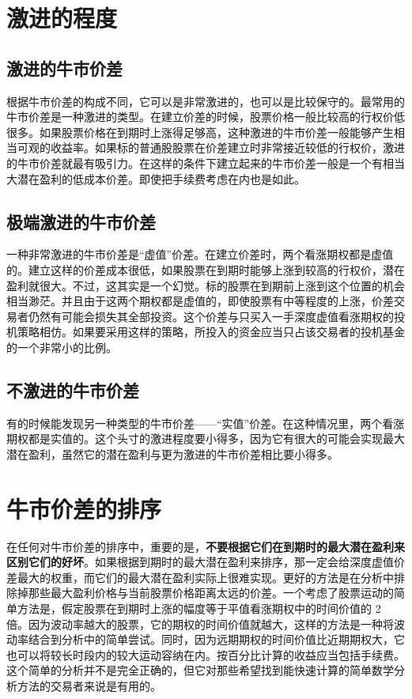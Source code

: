 \section{激进的程度}
\subsection{激进的牛市价差}
根据牛市价差的构成不同，它可以是非常激进的，也可以是比较保守的。最常用的牛市价差是一种激进的类型。在建立价差的时候，股票价格一般比较高的行权价低很多。如果股票价格在到期时上涨得足够高，这种激进的牛市价差一般能够产生相当可观的收益率。如果标的普通股股票在价差建立时非常接近较低的行权价，激进的牛市价差就最有吸引力。在这样的条件下建立起来的牛市价差一般是一个有相当大潜在盈利的低成本价差。即使把手续费考虑在内也是如此。
\subsection{极端激进的牛市价差}
一种非常激进的牛市价差是“虚值”价差。在建立价差时，两个看涨期权都是虚值的。建立这样的价差成本很低，如果股票在到期时能够上涨到较高的行权价，潜在盈利就很大。不过，这其实是一个幻觉。标的股票在到期前上涨到这个位置的机会相当渺茫。并且由于这两个期权都是虚值的，即使股票有中等程度的上涨，价差交易者仍然有可能会损失其全部投资。这个价差与只买入一手深度虚值看涨期权的投机策略相仿。如果要采用这样的策略，所投入的资金应当只占该交易者的投机基金的一个非常小的比例。
\subsection{不激进的牛市价差}
有的时候能发现另一种类型的牛市价差——“实值”价差。在这种情况里，两个看涨期权都是实值的。这个头寸的激进程度要小得多，因为它有很大的可能会实现最大潜在盈利，虽然它的潜在盈利与更为激进的牛市价差相比要小得多。
\section{牛市价差的排序}
在任何对牛市价差的排序中，重要的是，\textbf{不要根据它们在到期时的最大潜在盈利来区别它们的好坏}。如果根据到期时的最大潜在盈利来排序，那一定会给深度虚值价差最大的权重，而它们的最大潜在盈利实际上很难实现。更好的方法是在分析中排除掉那些最大盈利价格与当前股票价格距离太远的价差。一个考虑了股票运动的简单方法是，假定股票在到期时上涨的幅度等于平值看涨期权中的时间价值的 2 倍。因为波动率越大的股票，它的期权的时间价值就越大，这样的方法是一种将波动率结合到分析中的简单尝试。同时，因为远期期权的时间价值比近期期权大，它也可以将较长时段内的较大运动容纳在内。按百分比计算的收益应当包括手续费。这个简单的分析并不是完全正确的，但它对那些希望找到能快速计算的简单数学分析方法的交易者来说是有用的。
